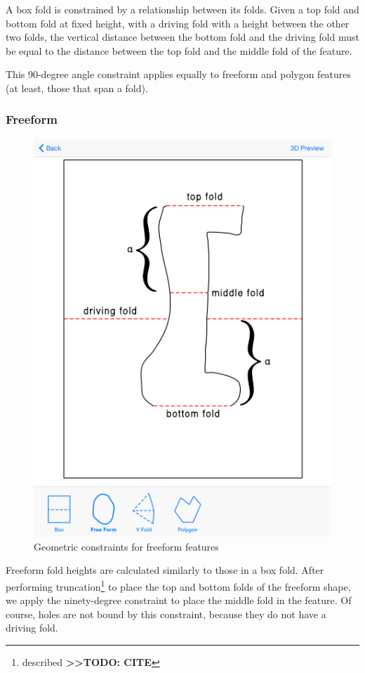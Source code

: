 A box fold is constrained by a relationship between its folds. Given a
top fold and bottom fold at fixed height, with a driving fold with a
height between the other two folds, the vertical distance between the
bottom fold and the driving fold must be equal to the distance between
the top fold and the middle fold of the feature.

This 90-degree angle constraint applies equally to freeform and polygon
features (at least, those that span a fold).

\subsubsection{Freeform}\label{freeform}

\begin{figure}[htbp]
\centering
\includegraphics{figures/45_Tech_Constraints/freeformConstraints.pdf}
\caption{Geometric constraints for freeform features}
\end{figure}

Freeform fold heights are calculated similarly to those in a box fold.
After performing truncation\footnote{described
  \textbf{\textgreater{}\textgreater{}TODO: CITE}} to place the top and
bottom folds of the freeform shape, we apply the ninety-degree
constraint to place the middle fold in the feature. Of course, holes are
not bound by this constraint, because they do not have a driving fold.

